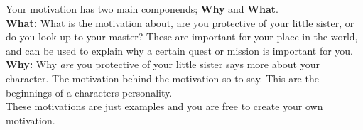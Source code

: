\begin{multicols}{2}

Your motivation has two main componends; \textbf{Why} and \textbf{What}.\\
\textbf{What:} What is the motivation about, are you protective of your little sister, or do you look up to your master? These are important for your place in the world, and can be used to explain why a certain quest or mission is important for you.\\
\textbf{Why:} Why \textit{are} you protective of your little sister says more about your character. The motivation behind the motivation so to say. This are the beginnings of a characters personality.\\
These motivations are just examples and you are free to create your own motivation.\\


\end{multicols}
